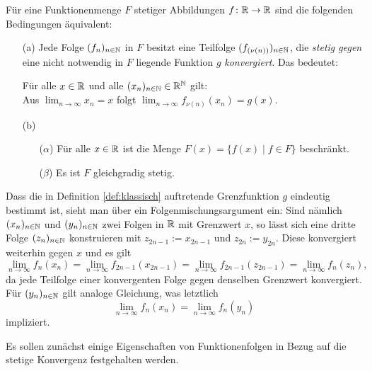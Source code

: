 \begin{defn} 
  \label{def:klassisch}
  Für eine Funktionenmenge $F$ stetiger Abbildungen $f \colon \mathbb{R} \to \mathbb{R}$ sind die folgenden Bedingungen äquivalent:
  \begin{itemize}
    \item[(a)] Jede Folge $(f_n)_{n \in \mathbb{N}}$ in $F$ besitzt eine Teilfolge $(f_{(\nu(n))})_{n \in \mathbb{N}}$, die \textit{stetig gegen} eine nicht notwendig in $F$ liegende Funktion $g$ \textit{konvergiert}. Das bedeutet:
      \begin{addmargin}[2em]{2em}%
        Für alle $x \in \mathbb{R}$ und alle $(x_n)_{n \in \mathbb{N}} \in \mathbb{R}^{\mathbb{N}}$ gilt: \\
        Aus $\lim_{n \to \infty} x_n = x$ folgt $\lim_{n \to \infty} f_{\nu(n)}(x_n) = g(x)$.
      \end{addmargin}
    \item[(b)]
      \begin{itemize}
        \item[($\alpha$)] Für alle $x \in \mathbb{R}$ ist die Menge $F(x) = \{ f(x) \mid f \in F\}$ beschränkt.
        \item[($\beta$)] Es ist $F$ gleichgradig stetig.
      \end{itemize}
  \end{itemize}
\end{defn}

Dass die in Definition \ref{def:klassisch} auftretende Grenzfunktion $g$ eindeutig bestimmt ist, sieht man über ein Folgenmischungsargument ein:
Sind nämlich $(x_n)_{n \in \mathbb{N}}$ und $(y_n)_{n \in \mathbb{N}}$ zwei Folgen in $\mathbb{R}$ mit Grenzwert $x$, so lässt sich eine dritte Folge $(z_n)_{n \in \mathbb{N}}$ konstruieren mit $z_{2n-1} := x_{2n-1}$ und $z_{2n} := y_{2n}$.
Diese konvergiert weiterhin gegen $x$ und es gilt 
\begin{displaymath}
   \lim_{n \to \infty} f_{n}(x_n) 
  =\lim_{n \to \infty} f_{2n-1}(x_{2n-1}) 
  =\lim_{n \to \infty} f_{2n-1}(z_{2n-1}) 
  =\lim_{n \to \infty} f_n(z_n),
\end{displaymath}
da jede Teilfolge einer konvergenten Folge gegen denselben Grenzwert konvergiert.
Für $(y_n)_{n \in \mathbb{N}}$ gilt analoge Gleichung, was letztlich
\begin{displaymath}
   \lim_{n \to \infty} f_{n}(x_n) = \lim_{n \to \infty} f_{n}(y_n) 
\end{displaymath}
impliziert.

Es sollen zunächst einige Eigenschaften von Funktionenfolgen in Bezug auf die stetige Konvergenz festgehalten werden.

